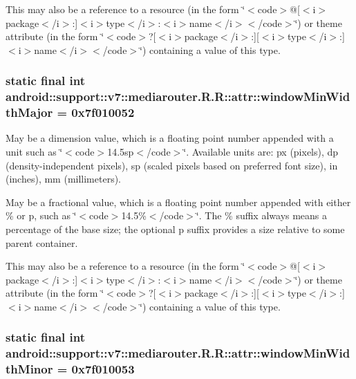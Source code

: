 This may also be a reference to a resource (in the form \char`\"{}$<$code$>$@\mbox{[}$<$i$>$package$<$/i$>$:\mbox{]}$<$i$>$type$<$/i$>$:$<$i$>$name$<$/i$>$$<$/code$>$\char`\"{}) or theme attribute (in the form \char`\"{}$<$code$>$?\mbox{[}$<$i$>$package$<$/i$>$:\mbox{]}\mbox{[}$<$i$>$type$<$/i$>$:\mbox{]}$<$i$>$name$<$/i$>$$<$/code$>$\char`\"{}) containing a value of this type. \hypertarget{classandroid_1_1support_1_1v7_1_1mediarouter_1_1_r_1_1attr_03c074fbf81a97b4140d94e4d4077140}{
\subsubsection[{windowMinWidthMajor}]{\setlength{\rightskip}{0pt plus 5cm}static final int android::support::v7::mediarouter.R.R::attr::windowMinWidthMajor = 0x7f010052}}
\label{classandroid_1_1support_1_1v7_1_1mediarouter_1_1_r_1_1attr_03c074fbf81a97b4140d94e4d4077140}


May be a dimension value, which is a floating point number appended with a unit such as \char`\"{}$<$code$>$14.5sp$<$/code$>$\char`\"{}. Available units are: px (pixels), dp (density-independent pixels), sp (scaled pixels based on preferred font size), in (inches), mm (millimeters). 

May be a fractional value, which is a floating point number appended with either \% or p, such as \char`\"{}$<$code$>$14.5\%$<$/code$>$\char`\"{}. The \% suffix always means a percentage of the base size; the optional p suffix provides a size relative to some parent container. 

This may also be a reference to a resource (in the form \char`\"{}$<$code$>$@\mbox{[}$<$i$>$package$<$/i$>$:\mbox{]}$<$i$>$type$<$/i$>$:$<$i$>$name$<$/i$>$$<$/code$>$\char`\"{}) or theme attribute (in the form \char`\"{}$<$code$>$?\mbox{[}$<$i$>$package$<$/i$>$:\mbox{]}\mbox{[}$<$i$>$type$<$/i$>$:\mbox{]}$<$i$>$name$<$/i$>$$<$/code$>$\char`\"{}) containing a value of this type. \hypertarget{classandroid_1_1support_1_1v7_1_1mediarouter_1_1_r_1_1attr_fa544e0b8743977d7d3b5c0054b3d641}{
\subsubsection[{windowMinWidthMinor}]{\setlength{\rightskip}{0pt plus 5cm}static final int android::support::v7::mediarouter.R.R::attr::windowMinWidthMinor = 0x7f010053}}
\label{classandroid_1_1support_1_1v7_1_1mediarouter_1_1_r_1_1attr_fa544e0b8743977d7d3b5c0054b3d641}


